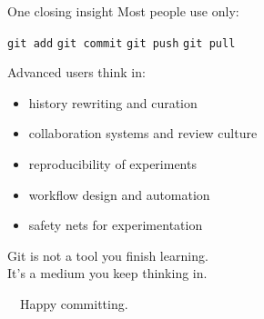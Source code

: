 \documentclass[10pt,aspectratio=169]{beamer}
\begin{document}
\begin{frame}{One closing insight}
  Most people use only:
  \begin{center}
    \texttt{git add} \quad \texttt{git commit} \quad \texttt{git push} \quad \texttt{git pull}
  \end{center}

  \vspace{0.6em}
  Advanced users think in:
  \begin{itemize}
    \item history rewriting and curation
    \item collaboration systems and review culture
    \item reproducibility of experiments
    \item workflow design and automation
    \item safety nets for experimentation
  \end{itemize}

  \vspace{0.8em}
  \begin{center}
    \large\color{ghAccent}
    Git is not a tool you finish learning.\\
    It's a medium you keep thinking in.
  \end{center}

  \vspace{0.4em}
  \begin{center}
    \footnotesize\color{ghMuted}
    \faGithub\ \ Happy committing.
  \end{center}
\end{frame}
\end{document}
